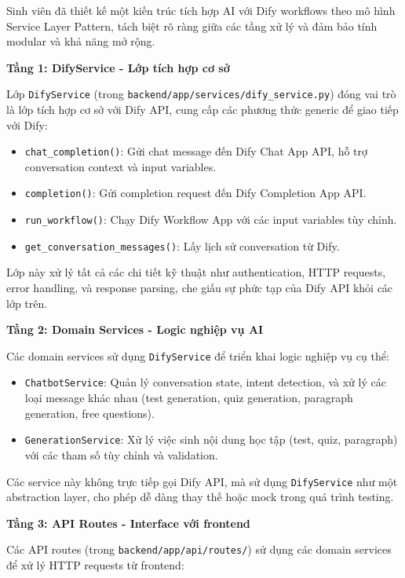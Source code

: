 \documentclass[../DoAn.tex]{subfiles}
\begin{document}
Sinh viên đã thiết kế một kiến trúc tích hợp AI với Dify workflows theo mô hình Service Layer Pattern, tách biệt rõ ràng giữa các tầng xử lý và đảm bảo tính modular và khả năng mở rộng.

\textbf{Tầng 1: DifyService - Lớp tích hợp cơ sở}

Lớp \texttt{DifyService} (trong \texttt{backend/app/services/dify\_service.py}) đóng vai trò là lớp tích hợp cơ sở với Dify API, cung cấp các phương thức generic để giao tiếp với Dify:

\begin{itemize}
    \item \texttt{chat\_completion()}: Gửi chat message đến Dify Chat App API, hỗ trợ conversation context và input variables.
    \item \texttt{completion()}: Gửi completion request đến Dify Completion App API.
    \item \texttt{run\_workflow()}: Chạy Dify Workflow App với các input variables tùy chỉnh.
    \item \texttt{get\_conversation\_messages()}: Lấy lịch sử conversation từ Dify.
\end{itemize}

Lớp này xử lý tất cả các chi tiết kỹ thuật như authentication, HTTP requests, error handling, và response parsing, che giấu sự phức tạp của Dify API khỏi các lớp trên.

\textbf{Tầng 2: Domain Services - Logic nghiệp vụ AI}

Các domain services sử dụng \texttt{DifyService} để triển khai logic nghiệp vụ cụ thể:

\begin{itemize}
    \item \texttt{ChatbotService}: Quản lý conversation state, intent detection, và xử lý các loại message khác nhau (test generation, quiz generation, paragraph generation, free questions).
    \item \texttt{GenerationService}: Xử lý việc sinh nội dung học tập (test, quiz, paragraph) với các tham số tùy chỉnh và validation.
\end{itemize}

Các service này không trực tiếp gọi Dify API, mà sử dụng \texttt{DifyService} như một abstraction layer, cho phép dễ dàng thay thế hoặc mock trong quá trình testing.

\textbf{Tầng 3: API Routes - Interface với frontend}

Các API routes (trong \texttt{backend/app/api/routes/}) sử dụng các domain services để xử lý HTTP requests từ frontend:
\end{document}
